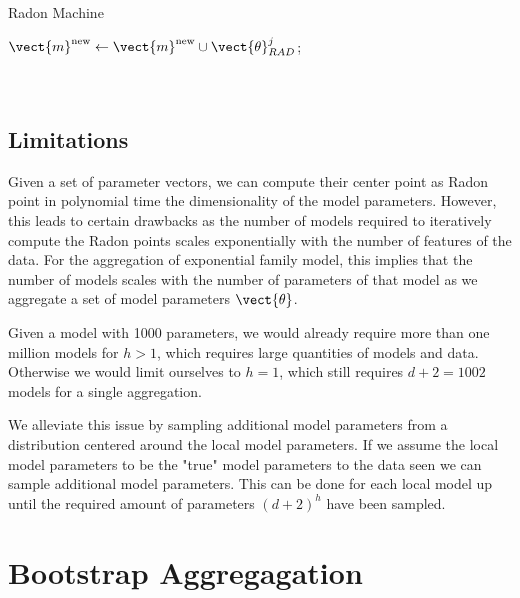 \begin{algo}{Radon Machine}
\begin{algorithm}[H]
\begin{algorithmic}[1]
{{                $\vect{m}^{\text{new}}\leftarrow \vect{m}^{\text{new}} \cup \vect{\theta}_{RAD}^j$;  \\
            } 
            \ENDFOR
            }\\
            \\
            \ENDFOR
        \end{algorithmic}
    \end{algorithm}
\end{algo}

\subsection{Limitations}
Given a set of parameter vectors, we can compute their center point as Radon point in polynomial time \wrt the dimensionality of the model parameters.
However, this leads to certain drawbacks as the number of models required to iteratively compute the Radon points scales exponentially with the number of features of the data.
For the aggregation of exponential family model, this implies that the number of models scales with the number of parameters of that model as we aggregate a set of model parameters $\vect{\theta}$.

Given a model with 1000 parameters, we would already require more than one million models for $h > 1$, which requires large quantities of models and data.
Otherwise we would limit ourselves to $h=1$, which still requires $d+2 = 1002$ models for a single aggregation.

We alleviate this issue by sampling additional model parameters from a distribution centered around the local model parameters. 
If we assume the local model parameters to be the "true" model parameters \wrt to the data seen we can sample additional model parameters. 
This can be done for each local model up until the required amount of parameters $(d+2)^h$ have been sampled.


\section{Bootstrap Aggregagation}

